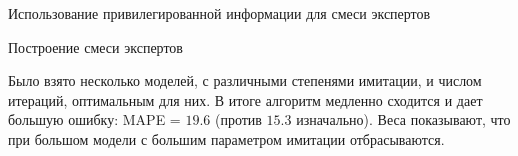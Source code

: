 \documentclass{beamer}
\begin{document}
\begin{frame}{Использование привилегированной информации для смеси экспертов}

\begin{figure}[!htb]
\end{figure}


\end{frame}


\begin{frame}{Построение смеси экспертов}

Было взято несколько моделей, с различными степенями имитации, и числом итераций, оптимальным для них. В итоге алгоритм медленно сходится и дает большую ошибку:  MAPE = $19.6$ (против $15.3$ изначально). Веса показывают, что при большом модели с большим параметром имитации отбрасываются.   

\end{frame}
\end{document}
